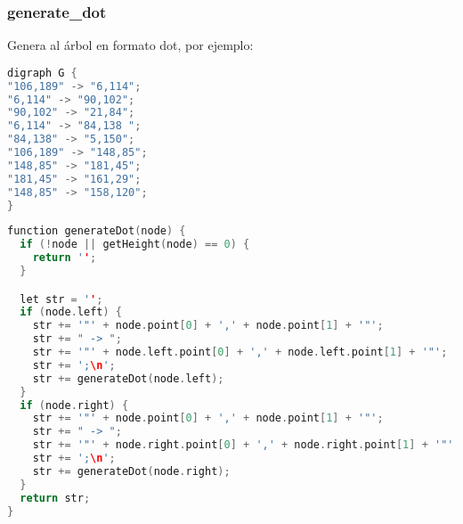 \subsubsection{generate\_dot }Genera al árbol en formato dot, por ejemplo:
\begin{lstlisting}[language=C++,
                   directivestyle={\color{black}}
                   emph={int,char,double,float,unsigned},
                   emphstyle={\color{blue}}
                  ]
digraph G {
"106,189" -> "6,114";
"6,114" -> "90,102";
"90,102" -> "21,84";
"6,114" -> "84,138 ";
"84,138" -> "5,150";
"106,189" -> "148,85";
"148,85" -> "181,45";
"181,45" -> "161,29";
"148,85" -> "158,120";
}
\end{lstlisting}

\begin{lstlisting}[language=C++,
                   directivestyle={\color{black}}
                   emph={int,char,double,float,unsigned},
                   emphstyle={\color{blue}}
                  ]
function generateDot(node) {
  if (!node || getHeight(node) == 0) {
    return '';
  }

  let str = '';
  if (node.left) {
    str += '"' + node.point[0] + ',' + node.point[1] + '"';
    str += " -> ";
    str += '"' + node.left.point[0] + ',' + node.left.point[1] + '"';
    str += ';\n';
    str += generateDot(node.left);
  }
  if (node.right) {
    str += '"' + node.point[0] + ',' + node.point[1] + '"';
    str += " -> ";
    str += '"' + node.right.point[0] + ',' + node.right.point[1] + '"';
    str += ';\n';
    str += generateDot(node.right);
  }
  return str;
}
\end{lstlisting}

